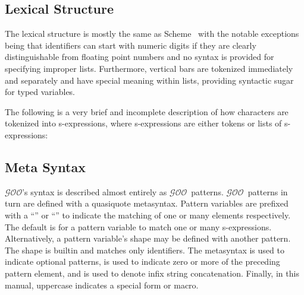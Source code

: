 \documentclass[twoside,twocolumn,9pt]{extarticle}
\newcommand{\goo}{$\mathcal{GOO}$}
\begin{document}
\subsection{Lexical Structure}

The lexical structure is mostly the same as 
Scheme~\cite{Kelsey:Clinger:Rees:hosc:1998} with
the notable exceptions being that identifiers can start with numeric digits
if they are clearly distinguishable from floating point numbers and
no syntax is provided for specifying improper lists.
Furthermore, vertical bars are tokenized immediately and separately and have
special meaning within lists, providing syntactic sugar for typed
variables.

The following is a very brief and incomplete description
of how characters are tokenized into s-expressions, where
s-expressions are either tokens or lists of s-expressions:

\begin{defs}
\end{defs}

\subsection{Meta Syntax}

\goo's syntax is described almost entirely as \goo\ patterns.  \goo\
patterns in turn are defined with a quasiquote metasyntax.  Pattern
variables are prefixed with a ``\kode{,}'' or ``\kode{,@}'' to
indicate the matching of one or many elements respectively.  The
default is for a pattern variable to match one or many s-expressions.  
Alternatively, a pattern variable's shape may be defined with another
pattern. 
The  shape is builtin and matches only identifiers.
The  metasyntax is used to indicate optional
patterns,  is used to indicate zero or more of the
preceding pattern element, and \kode{\#\#} is used to denote infix
string concatenation.
Finally, in this manual, uppercase indicates a special form or macro.
\end{document}
